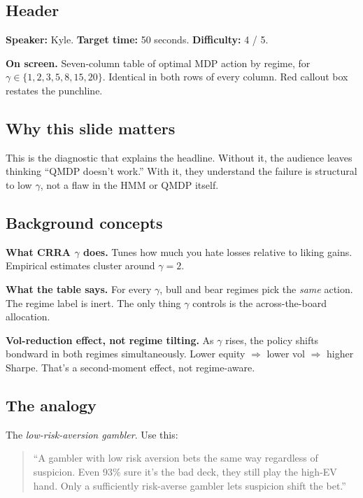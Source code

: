 \documentclass[11pt]{article}
\begin{document}
\subsection*{Header}

\textbf{Speaker:} Kyle. \quad\textbf{Target time:} 50 seconds. \quad\textbf{Difficulty:} 4 / 5.

\textbf{On screen.} Seven-column table of optimal MDP action by regime, for $\gamma \in \{1, 2, 3, 5, 8, 15, 20\}$. Identical in both rows of every column. Red callout box restates the punchline.

\subsection*{Why this slide matters}

This is the diagnostic that explains the headline. Without it, the audience leaves thinking ``QMDP doesn't work.'' With it, they understand the failure is structural to low $\gamma$, not a flaw in the HMM or QMDP itself.

\subsection*{Background concepts}

\textbf{What CRRA $\gamma$ does.} Tunes how much you hate losses relative to liking gains. Empirical estimates cluster around $\gamma = 2$.

\textbf{What the table says.} For every $\gamma$, bull and bear regimes pick the \emph{same} action. The regime label is inert. The only thing $\gamma$ controls is the across-the-board allocation.

\textbf{Vol-reduction effect, not regime tilting.} As $\gamma$ rises, the policy shifts bondward in both regimes simultaneously. Lower equity $\Rightarrow$ lower vol $\Rightarrow$ higher Sharpe. That's a second-moment effect, not regime-aware.

\subsection*{The analogy}

The \emph{low-risk-aversion gambler}. Use this:

\begin{quote}
``A gambler with low risk aversion bets the same way regardless of suspicion. Even 93\% sure it's the bad deck, they still play the high-EV hand. Only a sufficiently risk-averse gambler lets suspicion shift the bet.''
\end{quote}
\end{document}
